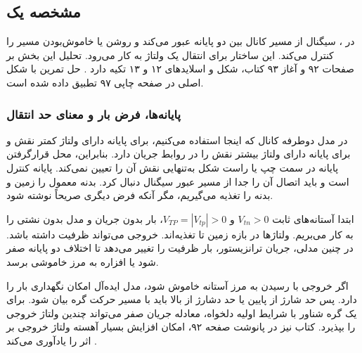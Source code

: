 \clearpage
\subsection{مشخصه  یک }
\label{sec:pass-transistor}
در ، سیگنال از مسیر کانال بین دو پایانه
عبور می‌کند و  روشن یا خاموش‌بودن مسیر را کنترل
می‌کند. این ساختار برای انتقال یک ولتاژ به کار می‌رود.
تحلیل این بخش بر صفحات ۹۲ و آغاز ۹۳ کتاب، شکل
 و اسلایدهای ۱۲ و ۱۳ تکیه دارد
\cite{weste,dcslides}. حل تمرین  با شکل اصلی
 در صفحه چاپی ۹۷ تطبیق داده شده است.

\subsubsection{پایانه‌ها، فرض بار و معنای حد انتقال}
\label{sec:pass-conventions}
در مدل دوطرفه کانال که اینجا استفاده می‌کنیم، برای 
پایانه دارای ولتاژ کمتر نقش  و برای 
پایانه دارای ولتاژ بیشتر نقش  را در روابط جریان
دارد. بنابراین، محل قرارگرفتن پایانه در سمت چپ یا راست شکل
به‌تنهایی نقش آن را تعیین نمی‌کند.  پایانه کنترل است
و باید اتصال آن را جدا از مسیر عبور سیگنال دنبال کرد.
بدنه  معمول را زمین و بدنه  را تغذیه
می‌گیریم، مگر آنکه فرض دیگری صریحاً نوشته شود.

ابتدا آستانه‌های ثابت \(V_{tn}>0\) و
\(V_{TP}=|V_{tp}|>0\)، بار بدون جریان  و مدل بدون
نشتی را به کار می‌بریم. ولتاژها در بازه زمین تا تغذیه‌اند.
خروجی می‌تواند ظرفیت داشته باشد. در چنین مدلی، جریان
ترانزیستور، بار ظرفیت را تغییر می‌دهد تا اختلاف دو پایانه صفر
شود یا افزاره به مرز خاموشی برسد.

اگر خروجی با رسیدن به مرز آستانه خاموش شود، مدل ایده‌آل
امکان نگهداری بار را دارد. پس حد شارژ از پایین یا حد دشارژ
از بالا باید با مسیر حرکت گره بیان شود. برای یک گره شناور
با شرایط اولیه دلخواه، معادله جریان صفر می‌تواند چندین
ولتاژ خروجی را بپذیرد. کتاب نیز در پانوشت صفحه ۹۲، امکان
افزایش بسیار آهسته ولتاژ خروجی  بر اثر
 را یادآوری می‌کند \cite{weste}.

